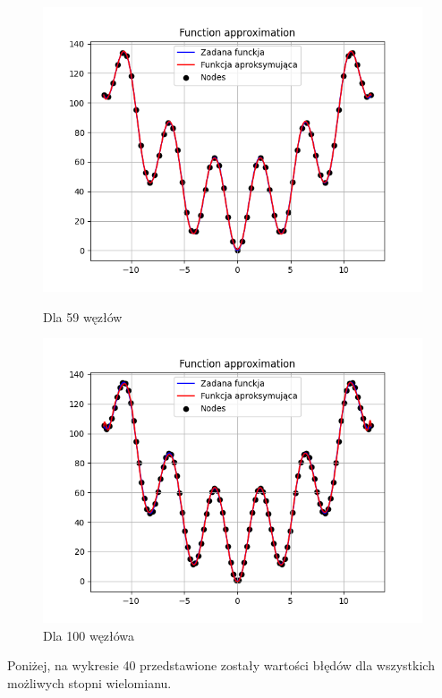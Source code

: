\documentclass{article}
\begin{document}
\begin{figure}[H]
\begin{minipage}[b]{0.49\textwidth}
    \begin{minipage}[b]{\textwidth}
      \includegraphics[width=\textwidth]{img40.png}
      \caption{Dla 59 węzłów}
    \end{minipage}
    \vspace*{\fill}
    \begin{minipage}[b]{\textwidth}
      \includegraphics[width=\textwidth]{img41.png}
      \caption{Dla 100 węzłówa}
    \end{minipage}
  \end{minipage}
\end{figure}

Poniżej, na wykresie 40 przedstawione zostały wartości błędów dla wszystkich możliwych stopni wielomianu.
\end{document}
